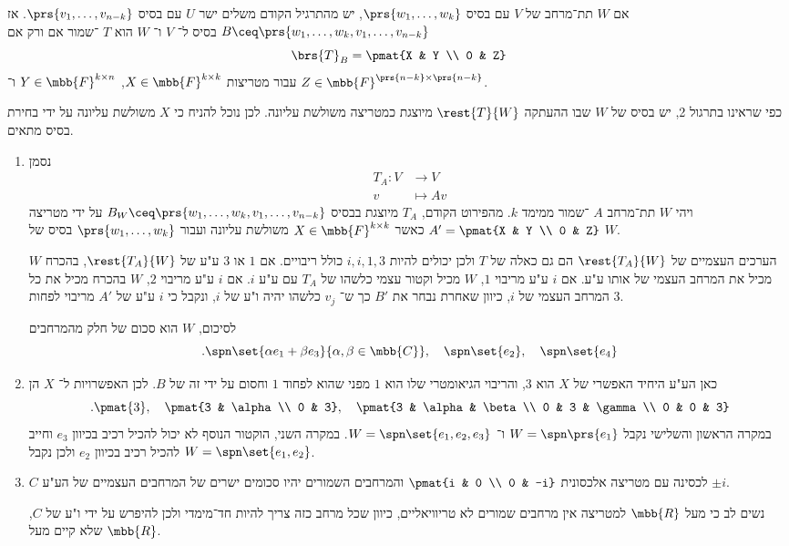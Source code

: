 \documentclass[article, 10pt,oneside]{article}
\begin{document}
\begin{solution}
אם
$W$
תת־מרחב של
$V$
עם בסיס
$\prs{w_1, \ldots, w_k}$,
יש מהתרגיל הקודם משלים ישר
$U$
עם בסיס
$\prs{v_1, \ldots, v_{n-k}}$.
אז
$B \ceq \prs{w_1, \ldots, w_k, v_1, \ldots, v_{n-k}}$
בסיס ל־%
$V$
ו־%
$W$
הוא
$T$%
־שמור אם ורק אם
\[\brs{T}_B = \pmat{X & Y \\ 0 & Z}\]
עבור מטריצות
$X \in \mbb{F}^{k \times k}$, $Y \in \mbb{F}^{k \times n}$
ו־%
$Z \in \mbb{F}^{\prs{n-k} \times \prs{n-k}}$.

כפי שראינו בתרגול 2, יש בסיס של
$W$
שבו ההעתקה
$\rest{T}{W}$
מיוצגת כמטריצה משולשת עליונה. לכן נוכל להניח כי
$X$
משולשת עליונה על ידי בחירת בסיס מתאים.

\begin{enumerate}
\item%
נסמן
\begin{align*}
T_A \colon V &\to V \\
v &\mapsto Av
\end{align*}
 ויהי
 $W$
 תת־מרחב
 $A$%
 ־שמור ממימד
 $k$.
 מהפירוט הקודם,
 $T_A$
מיוצגת בבסיס
$B_W \ceq \prs{w_1, \ldots, w_k, v_1, \ldots, v_{n-k}}$
על ידי מטריצה
$A' = \pmat{X & Y \\ 0 & Z}$
כאשר
$X \in \mbb{F}^{k \times k}$
משולשת עליונה ועבור
$\prs{w_1, \ldots, w_k}$
בסיס של
$W$. 

הערכים העצמיים של
$\rest{T_A}{W}$
הם גם כאלה של
$T$
ולכן יכולים להיות
$i,i,1,3$
כולל ריבויים. אם
$1$
או
$3$
ע"ע של
$\rest{T_A}{W}$,
בהכרח
$W$
מכיל את המרחב העצמי של אותו ע"ע.
אם
$i$
ע"ע מריבוי
$1$,
$W$
 מכיל וקטור עצמי כלשהו של
 $T_A$
 עם ע"ע
 $i$.
 אם
 $i$
 ע"ע מריבוי
 $2$,
 $W$
 בהכרח מכיל את כל המרחב העצמי של
 $i$,
 כיוון שאחרת נבחר את
 $B'$
 כך ש־%
 $v_j$
 כלשהו יהיה ו"ע של
 $i$,
 ונקבל כי
 $i$
 ע"ע של
 $A'$
 מריבוי לפחות
 $3$.
 
 לסיכום,
 $W$
 הוא סכום של חלק מהמרחבים
 \[\text{.} \spn\set{\alpha e_1 + \beta e_3}{\alpha,\beta \in \mbb{C}}, \quad \spn\set{e_2}, \quad \spn\set{e_4}\]

\item כאן הע"ע היחיד האפשרי של
$X$
הוא
$3$,
והריבוי הגיאומטרי שלו הוא
$1$
מפני שהוא לפחוד
$1$
וחסום על ידי זה של
$B$.
לכן האפשרויות ל־%
$X$
הן
\[\text{.} \pmat{3}, \quad \pmat{3 & \alpha \\ 0 & 3}, \quad \pmat{3 & \alpha & \beta \\ 0 & 3 & \gamma \\ 0 & 0 & 3}\]
במקרה הראשון והשלישי נקבל
$W = \spn\prs{e_1}$
ו־%
$W = \spn\set{e_1, e_2, e_3}$.
 במקרה השני, הוקטור הנוסף לא יכול להכיל רכיב בכיוון
 $e_3$
וחייב להכיל רכיב בכיוון
$e_2$
ולכן נקבל
$W = \spn\set{e_1, e_2}$.

\item
$C$
לכסינה עם מטריצה אלכסונית
$\pmat{i & 0 \\ 0 & -i}$
והמרחבים השמורים יהיו סכומים ישרים של המרחבים העצמיים של הע"ע
$\pm i$.

נשים לב כי מעל
$\mbb{R}$
למטריצה אין מרחבים שמורים לא טריוויאליים, כיוון שכל מרחב כזה צריך להיות חד־מימדי ולכן להיפרש על ידי ו"ע של
$C$,
שלא קיים מעל
$\mbb{R}$.
\end{enumerate}
\end{solution}
\end{document}
